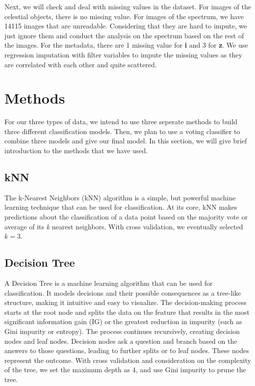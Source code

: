 \documentclass[
  11pt,
]{article}
\begin{document}
Next, we will check and deal with missing values in the dataset. For images of the celestial objects, there is no missing value. For images of the spectrum, we have 14115 images that are unreadable. Considering that they are hard to impute, we just ignore them and conduct the analysis on the spectrum based on the rest of the images. For the metadata, there are 1 missing value for \textbf{i} and 3 for \textbf{z}. We use regression imputation with filter variables to impute the missing values as they are correlated with each other and quite scattered.

\hypertarget{methods}{%
\section{Methods}\label{methods}}

For our three types of data, we intend to use three seperate methods to build three different classification models. Then, we plan to use a voting classifier to combine three models and give our final model. In this section, we will give brief introduction to the methods that we have used.

\hypertarget{knn}{%
\subsection{kNN}\label{knn}}

The k-Nearest Neighbors (kNN) algorithm is a simple, but powerful machine learning technique that can be used for classification. At its core, kNN makes predictions about the classification of a data point based on the majority vote or average of its \emph{k} nearest neighbors. With cross validation, we eventually selected \(k = 3\).

\hypertarget{decision-tree}{%
\subsection{Decision Tree}\label{decision-tree}}

A Decision Tree is a machine learning algorithm that can be used for classification. It models decisions and their possible consequences as a tree-like structure, making it intuitive and easy to visualize. The decision-making process starts at the root node and splits the data on the feature that results in the most significant information gain (IG) or the greatest reduction in impurity (such as Gini impurity or entropy). The process continues recursively, creating decision nodes and leaf nodes. Decision nodes ask a question and branch based on the answers to those questions, leading to further splits or to leaf nodes. These nodes represent the outcome. With cross validation and consideration on the complexity of the tree, we set the maximum depth as 4, and use Gini impurity to prune the tree.
\end{document}
